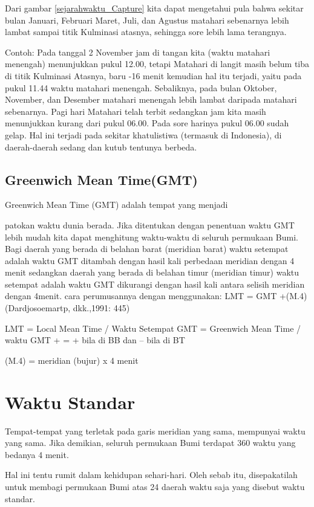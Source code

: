  Dari gambar \ref{sejarahwaktu_Capture} kita dapat mengetahui pula bahwa sekitar bulan Januari, Februari
 Maret, Juli, dan Agustus matahari sebenarnya lebih lambat sampai titik Kulminasi atasnya,
 sehingga sore lebih lama terangnya.
 
	Contoh: Pada tanggal 2 November jam di tangan kita (waktu matahari menengah) 
	menunjukkan pukul 12.00, tetapi Matahari di langit masih belum tiba di titik Kulminasi 
	Atasnya, baru -16 menit kemudian hal itu terjadi, yaitu pada pukul 11.44 waktu matahari 
	menengah. Sebaliknya, pada bulan Oktober, November, dan Desember matahari menengah 
	lebih lambat daripada matahari sebenarnya. Pagi hari Matahari telah terbit sedangkan 
	jam kita masih menunjukkan kurang dari pukul 06.00. Pada sore harinya pukul 06.00 sudah
	gelap. Hal ini terjadi pada sekitar khatulistiwa (termasuk di Indonesia), 
	di daerah-daerah sedang dan kutub tentunya berbeda.
	

\subsection{Greenwich Mean Time(GMT)}
Greenwich Mean Time (GMT) adalah tempat yang menjadi

 patokan waktu dunia berada. Jika ditentukan dengan penentuan waktu GMT lebih mudah kita
 dapat menghitung waktu-waktu di seluruh permukaan Bumi. Bagi daerah yang
 berada di belahan barat (meridian barat) waktu setempat adalah waktu GMT
 ditambah dengan hasil kali perbedaan meridian dengan 4 menit sedangkan daerah
 yang berada di belahan timur (meridian timur) waktu setempat adalah waktu GMT
 dikurangi dengan hasil kali antara selisih meridian dengan 4menit. 
 cara perumusannya dengan menggunakan:
					LMT = GMT +(M.4)
			(Dardjosoemartp, dkk.,1991: 445)
			
	LMT = Local Mean Time / Waktu Setempat 
GMT = Greenwich Mean Time / waktu GMT
 + = + bila di BB dan – bila di BT 

(M.4) = meridian (bujur) x 4 menit

\section{Waktu Standar}
Tempat-tempat yang terletak pada garis meridian yang sama, mempunyai waktu yang sama.
 Jika demikian, seluruh permukaan Bumi terdapat 360 waktu yang bedanya 4 menit.

 Hal ini tentu rumit dalam kehidupan sehari-hari. Oleh sebab itu, disepakatilah untuk
 membagi permukaan Bumi atas 24 daerah waktu saja yang disebut waktu standar.
 
